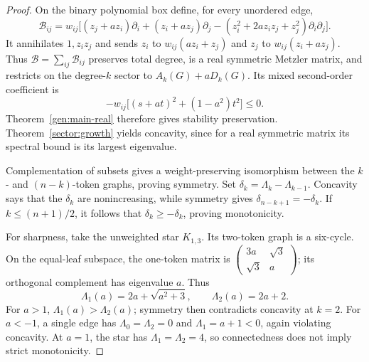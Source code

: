 \documentclass[reqno]{amsart}
\theoremstyle{definition}
\theoremstyle{remark}
\begin{document}
\begin{proof}
On the binary polynomial box define, for every unordered edge,
\[
 \mathcal B_{ij}=w_{ij}\bigl[
 (z_j+az_i)\partial_i+(z_i+az_j)\partial_j
 -(z_i^2+2az_iz_j+z_j^2)\partial_i\partial_j\bigr].
\]
It annihilates \(1,z_iz_j\) and sends
\(z_i\) to \(w_{ij}(az_i+z_j)\) and
\(z_j\) to \(w_{ij}(z_i+az_j)\).
Thus \(\mathcal B=\sum_{ij}\mathcal B_{ij}\) preserves total
degree, is a real symmetric Metzler matrix, and restricts on the
degree-\(k\) sector to \(A_k(G)+aD_k(G)\).
Its mixed second-order coefficient is
\[
 -w_{ij}\bigl[(s+at)^2+(1-a^2)t^2\bigr]\le0.
\]
Theorem~\ref{gen:main-real} therefore gives stability preservation.
Theorem~\ref{sector:growth} yields concavity, since for a real
symmetric matrix its spectral bound is its largest eigenvalue.

Complementation of subsets gives a weight-preserving isomorphism
between the \(k\)- and \((n-k)\)-token graphs, proving symmetry.
Set \(\delta_k=\Lambda_k-\Lambda_{k-1}\). Concavity says that
the \(\delta_k\) are nonincreasing, while symmetry gives
\(\delta_{n-k+1}=-\delta_k\). If \(k\le(n+1)/2\), it follows that
\(\delta_k\ge-\delta_k\), proving monotonicity.

For sharpness, take the unweighted star \(K_{1,3}\). Its two-token
graph is a six-cycle. On the equal-leaf subspace, the one-token
matrix is
\(\left(\begin{smallmatrix}3a&\sqrt3\\\sqrt3&a\end{smallmatrix}\right)\);
its orthogonal complement has eigenvalue \(a\). Thus
\[
 \Lambda_1(a)=2a+\sqrt{a^2+3},\qquad
 \Lambda_2(a)=2a+2.
\]
For \(a>1\), \(\Lambda_1(a)>\Lambda_2(a)\); symmetry then
contradicts concavity at \(k=2\). For \(a<-1\), a single edge
has \(\Lambda_0=\Lambda_2=0\) and \(\Lambda_1=a+1<0\), again
violating concavity. At \(a=1\), the star has
\(\Lambda_1=\Lambda_2=4\), so connectedness does not imply
strict monotonicity.
\end{proof}
\end{document}
